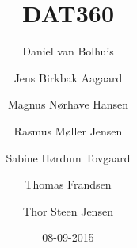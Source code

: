 

\title{DAT360}
\author{Daniel van Bolhuis \and Jens Birkbak Aagaard \and Magnus Nørhave Hansen \and Rasmus Møller Jensen \and Sabine Hørdum Tovgaard\and Thomas Frandsen \and Thor Steen Jensen}
\date{08-09-2015}



\frontmatter

\maketitle

\tableofcontents

\mainmatter



















